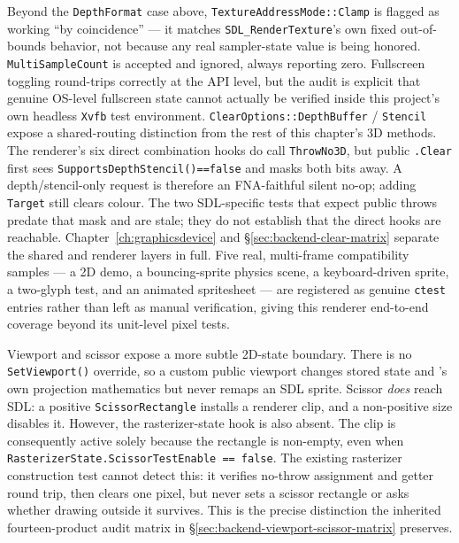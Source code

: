 Beyond the \texttt{DepthFormat} case above, \texttt{TextureAddressMode::Clamp} is flagged as
working ``by coincidence'' --- it matches \texttt{SDL\_RenderTexture}'s own fixed
out-of-bounds behavior, not because any real sampler-state value is being honored.
\texttt{MultiSampleCount} is accepted and ignored, always reporting zero. Fullscreen
toggling round-trips correctly at the API level, but the audit is explicit that genuine
OS-level fullscreen state cannot actually be verified inside this project's own headless
\texttt{Xvfb} test environment. \texttt{ClearOptions::DepthBuffer} / \texttt{Stencil} expose
a shared-routing distinction from the rest of this chapter's 3D methods. The renderer's six
direct combination hooks do call \texttt{ThrowNo3D}, but public
\texttt{.Clear} first sees \texttt{SupportsDepthStencil()==false} and masks
both bits away. A depth/stencil-only request is therefore an FNA-faithful silent no-op; adding
\texttt{Target} still clears colour. The two SDL-specific tests that expect public throws
predate that mask and are stale; they do not establish that the direct hooks are reachable.
Chapter~\ref{ch:graphicsdevice} and \S\ref{sec:backend-clear-matrix} separate the shared and
renderer layers in full. Five real, multi-frame compatibility samples --- a 2D
demo, a bouncing-sprite physics scene, a keyboard-driven sprite, a two-glyph
 test, and an animated spritesheet --- are registered as genuine
\texttt{ctest} entries rather than left as manual verification, giving this renderer
end-to-end coverage beyond its unit-level pixel tests.

Viewport and scissor expose a more subtle 2D-state boundary. There is no
\texttt{SetViewport()} override, so a custom public viewport changes stored state and
's own projection mathematics but never remaps an SDL sprite. Scissor
\emph{does} reach SDL: a positive \texttt{ScissorRectangle} installs a renderer clip, and a
non-positive size disables it. However, the rasterizer-state hook is also absent. The clip is
consequently active solely because
the rectangle is non-empty, even when
\texttt{RasterizerState.ScissorTestEnable == false}. The existing rasterizer construction test
cannot detect this: it verifies no-throw assignment and getter round trip, then clears one
pixel, but never sets a scissor rectangle or asks whether drawing outside it survives. This is
the precise distinction the inherited fourteen-product audit matrix in
\S\ref{sec:backend-viewport-scissor-matrix} preserves.

